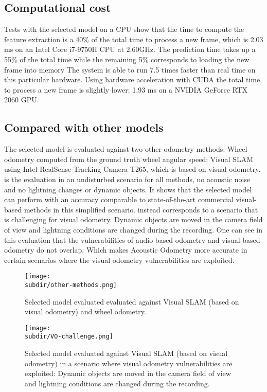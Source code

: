\subsection{Computational cost} Tests with the selected model on a CPU show that
the time to compute the feature extraction is a 40\% of the total time to
process a new frame, which is 2.03 ms on an Intel\textregistered{}
Core\texttrademark{} i7-9750H CPU at 2.60GHz. The prediction time takes up a
55\% of the total time while the remaining 5\% corresponds to loading the new
frame into memory The system is able to run 7.5 times faster than real time on
this particular hardware. Using hardware acceleration with CUDA the total time
to process a new frame is slightly lower: 1.93 ms on a NVIDIA GeForce RTX
2060 GPU.

\subsection{Compared with other models} The selected model is evaluated against
two other odometry methods: Wheel odometry computed from the ground truth wheel
angular speed; Visual SLAM using Intel\textregistered{}
RealSense\texttrademark{} Tracking Camera T265, which is based on visual
odometry.  is the evaluation in an undisturbed scenario
for all methods, no acoustic noise and no lightning changes or dynamic objects.
It shows that the selected model can perform with an accuracy comparable to
state-of-the-art commercial visual-based methods in this simplified scenario.
 instead corresponds to a scenario that is challenging
for visual odometry. Dynamic objects are moved in the camera field of view and
lightning conditions are changed during the recording. One can see in this
evaluation that the vulnerabilities of audio-based odometry and visual-based
odometry do not overlap. Which makes Acoustic Odometry more accurate in certain
scenarios where the visual odometry vulnerabilities are exploited.

\begin{figure}
    \centering
    \texttt{[image: \\subdir/other-methods.png]}
    \caption{Selected model evaluated
        evaluated against Visual SLAM (based on visual odometry) and wheel
        odometry.}
    \label{fig:other-methods}
\end{figure}

\begin{figure}
    \centering
    \texttt{[image: \\subdir/VO-challenge.png]}
    \caption{
        Selected model evaluated against Visual SLAM (based on visual odometry)
        in a scenario where visual odometry vulnerabilities are exploited:
        Dynamic objects are moved in the camera field of view and lightning
        conditions are changed during the recording.}
    \label{fig:VO-challenge}
\end{figure}

